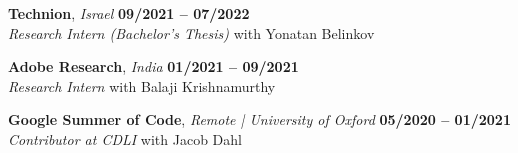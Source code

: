 \documentclass[10pt,letterpaper]{article}
\begin{document}
\vspace{3pt}

\textbf{Technion}, \textit{Israel} \hfill \textbf{09/2021 -- 07/2022} \\
\textit{Research Intern (Bachelor's Thesis)} with Yonatan Belinkov

\vspace{3pt}

\textbf{Adobe Research}, \textit{India} \hfill \textbf{01/2021 -- 09/2021} \\
\textit{Research Intern} with Balaji Krishnamurthy

\vspace{3pt}

\textbf{Google Summer of Code}, \textit{Remote | University of Oxford} \hfill \textbf{05/2020 -- 01/2021} \\
\textit{Contributor at CDLI} with Jacob Dahl
\end{document}
